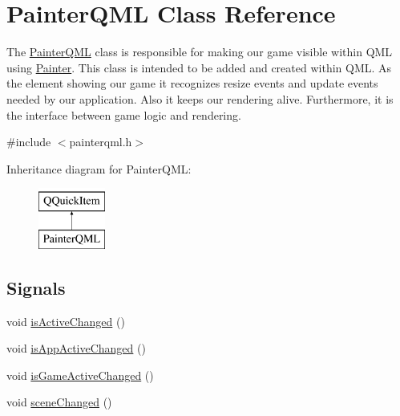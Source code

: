 \hypertarget{class_painter_q_m_l}{\section{Painter\+Q\+M\+L Class Reference}
\label{class_painter_q_m_l}
}


The \hyperlink{class_painter_q_m_l}{Painter\+Q\+M\+L} class is responsible for making our game visible within Q\+M\+L using \hyperlink{class_painter}{Painter}.  This class is intended to be added and created within Q\+M\+L. As the element showing our game it recognizes resize events and update events needed by our application. Also it keeps our rendering alive. Furthermore, it is the interface between game logic and rendering.  




{\ttfamily \#include $<$painterqml.\+h$>$}

Inheritance diagram for Painter\+Q\+M\+L\+:\begin{figure}[H]
\begin{center}
\leavevmode
\includegraphics[height=2.000000cm]{class_painter_q_m_l}
\end{center}
\end{figure}
\subsection*{Signals}
\begin{DoxyCompactItemize}
\item 
void \hyperlink{class_painter_q_m_l_a9143d84bcf1b2c150c28983459916a70}{is\+Active\+Changed} ()
\item 
void \hyperlink{class_painter_q_m_l_a4f2212d4a85e7844c2c7c02ebc5bcf49}{is\+App\+Active\+Changed} ()
\item 
void \hyperlink{class_painter_q_m_l_a46f7374519937259609441c88a3b8b9f}{is\+Game\+Active\+Changed} ()
\item 
void \hyperlink{class_painter_q_m_l_a5fce3441beea885f9ba2a70b2f21f0ae}{scene\+Changed} ()
\end{DoxyCompactItemize}
